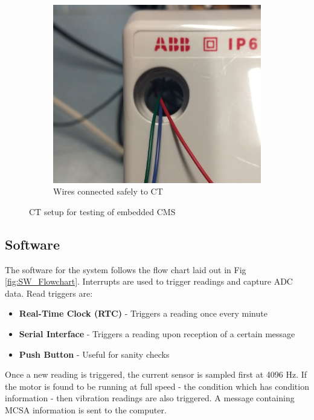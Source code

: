 \begin{figure}
\begin{subfigure}[b]{0.3\linewidth}
  \end{subfigure}
  \begin{subfigure}[b]{0.3\linewidth}
    \includegraphics[width=\linewidth]{Images/CT_Box2.jpg}
    \caption{Wires connected safely to CT}
  \end{subfigure}
  \caption{CT setup for testing of embedded CMS}
  \label{fig:HeatShrink}
\end{figure}

\subsection{Software}

The software for the system follows the flow chart laid out in Fig \ref{fig:SW_Flowchart}.
Interrupts are used to trigger readings and capture ADC data.
Read triggers are:
\begin{itemize}
    \item \textbf{Real-Time Clock (RTC)} - Triggers a reading once every minute
    \item \textbf{Serial Interface} - Triggers a reading upon reception of a certain message
    \item \textbf{Push Button} - Useful for sanity checks
\end{itemize}

Once a new reading is triggered, the current sensor is sampled first at 4096 Hz.
If the motor is found to be running at full speed - the condition which has condition information - then vibration readings are also triggered.
A message containing MCSA information is sent to the computer.
\par

